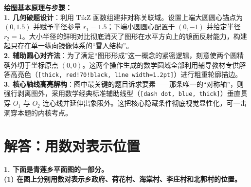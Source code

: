 \documentclass[12pt, a4paper]{ctexrep}
\begin{document}
{\small\color{blue!70!black}
\textbf{绘图基本原理与步骤：}\\
\textbf{1. 几何破题设计}：利用 TikZ 函数组建非对称关联域。设置上端大圆圆心锚点为 $(0, 1.5)$ 并赋予半径参量 $r_1=1.5$；下端小圆圆心配置于 $(0, -1)$ 并给定半径 $r_2=1$。大小半径的鲜明对比彻底消灭了图形在水平方向上的镜面反射能力，构建起只存在单一纵向镜像体系的“雪人结构”。\\
\textbf{2. 辅助圆心对齐法}：为了满足“图形形成”这一概念的紧密逻辑，刻意使两个圆精确外切于坐标原点 $(0,0)$。这两个操作生成的数学圆域全部利用辅导教材专供解答高亮色（\texttt{[thick, red!70!black, line width=1.2pt]}）进行粗重轮廓描边。\\
\textbf{3. 核心轴线高亮解构}：图中最关键的题目诉求要素——那条唯一的“对称轴”，则强行剥离图外，采用数学经典标准辅助线型（\texttt{[dash dot, blue, thick]}）垂直贯穿 $O_1$ 与 $O_2$ 连心线并延伸出象限外。这把核心隐藏条件彻底视觉显性化，可一击洞穿本题的内核考点。
}

\vspace{0.8cm}
\vspace{0.8cm}

\section{解答：用数对表示位置}

\vspace{0.4cm}

\noindent\textbf{1. 下面是青莲乡平面图的一部分。}\\
\textbf{(1) 在图上分别用数对表示乡政府、荷花村、海棠村、李庄村和北郭村的位置。}

\vspace{1.2cm}
\end{document}
